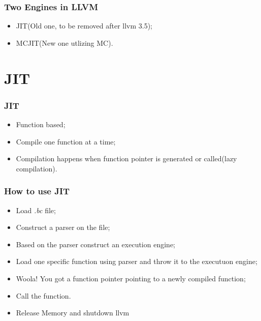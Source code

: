 \documentclass{beamer}
\begin{document}
\begin{frame}
\frametitle{Two Engines in LLVM}
	\begin{itemize}
	\item JIT(Old one, to be removed after llvm 3.5);
	\item MCJIT(New one utlizing MC).
	\end{itemize}
\end{frame}

\section{JIT}
\begin{frame}
\frametitle{JIT}
	\begin{itemize}
	\item Function based;
	\item Compile one function at a time;
	\item Compilation happens when function pointer is generated or called(lazy compilation).
	\end{itemize}
\end{frame}

\begin{frame}
\frametitle{How to use JIT}
	\begin{itemize}
		\item Load \textit{.bc} file;
		\item Construct a parser on the file;
		\item Based on the parser construct an execution engine;
		\item Load one specific function using parser and throw it to the executuon engine;
		\item Woola! You got a function pointer pointing to a newly compiled function;
		\item Call the function.
		\item Release Memory and shutdown llvm
	\end{itemize}
\end{frame}

\end{document}
